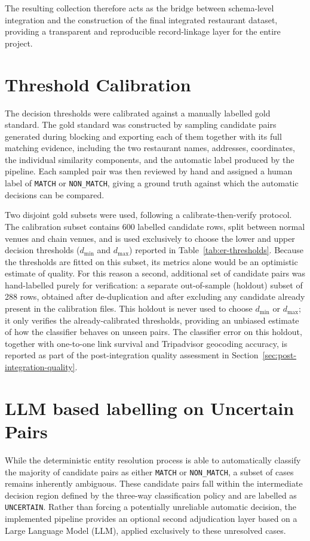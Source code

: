 The resulting collection therefore acts as the bridge between schema-level integration and the construction of the final integrated restaurant dataset, providing a transparent and reproducible record-linkage layer for the entire project.

\section{Threshold Calibration}

The decision thresholds were calibrated against a manually labelled gold standard. The gold standard was constructed by sampling candidate pairs generated during blocking and exporting each of them together with its full matching evidence, including the two restaurant names, addresses, coordinates, the individual similarity components, and the automatic label produced by the pipeline. Each sampled pair was then reviewed by hand and assigned a human label of \texttt{MATCH} or \texttt{NON\_MATCH}, giving a ground truth against which the automatic decisions can be compared.

Two disjoint gold subsets were used, following a calibrate-then-verify protocol. The calibration subset contains 600 labelled candidate rows, split between normal venues and chain venues, and is used exclusively to choose the lower and upper decision thresholds ($d_{\min}$ and $d_{\max}$) reported in Table~\ref{tab:er-thresholds}. Because the thresholds are fitted on this subset, its metrics alone would be an optimistic estimate of quality. For this reason a second, additional set of candidate pairs was hand-labelled purely for verification: a separate out-of-sample (holdout) subset of 288 rows, obtained after de-duplication and after excluding any candidate already present in the calibration files. This holdout is never used to choose $d_{\min}$ or $d_{\max}$; it only verifies the already-calibrated thresholds, providing an unbiased estimate of how the classifier behaves on unseen pairs. The classifier error on this holdout, together with one-to-one link survival and Tripadvisor geocoding accuracy, is reported as part of the post-integration quality assessment in Section~\ref{sec:post-integration-quality}.

\section{LLM based labelling on Uncertain Pairs}

While the deterministic entity resolution process is able to automatically classify the majority of candidate pairs as either \texttt{MATCH} or \texttt{NON\_MATCH}, a subset of cases remains inherently ambiguous. These candidate pairs fall within the intermediate decision region defined by the three-way classification policy and are labelled as \texttt{UNCERTAIN}. Rather than forcing a potentially unreliable automatic decision, the implemented pipeline provides an optional second adjudication layer based on a Large Language Model (LLM), applied exclusively to these unresolved cases.

